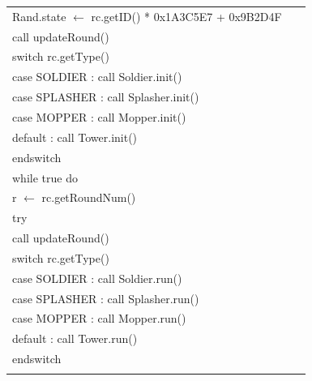 \documentclass{article}
\newenvironment{pseudobox}
{
\centering
\begin{longtable}{|p{0.94\linewidth}|}
\hline
}
{
\\ \hline
\end{longtable}
\vspace{0.05cm}
}
\begin{document}
\begin{pseudobox}
\hspace*{2em} Rand.state $\leftarrow$ rc.getID() * 0x1A3C5E7 + 0x9B2D4F \\

\hspace*{2em} call updateRound() \\

\hspace*{2em} switch rc.getType() \\
\hspace*{3em} case SOLDIER  : call Soldier.init() \\
\hspace*{3em} case SPLASHER : call Splasher.init() \\
\hspace*{3em} case MOPPER   : call Mopper.init() \\
\hspace*{3em} default       : call Tower.init() \\
\hspace*{2em} endswitch \\

\hspace*{2em} while true do \\
\hspace*{3em} r $\leftarrow$ rc.getRoundNum() \\
\hspace*{3em} try \\
\hspace*{4em} call updateRound() \\
\hspace*{4em} switch rc.getType() \\
\hspace*{5em} case SOLDIER  : call Soldier.run() \\
\hspace*{5em} case SPLASHER : call Splasher.run() \\
\hspace*{5em} case MOPPER   : call Mopper.run() \\
\hspace*{5em} default       : call Tower.run() \\
\hspace*{4em} endswitch \\


\end{pseudobox}
\end{document}
